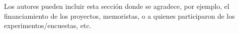 \begin{agradecimientos}
  Los autores pueden incluir esta sección donde se agradece, por ejemplo, el financiamiento de los proyectos, memoristas, o a quienes participaron de los experimentos/encuestas, etc. 
\end{agradecimientos}
